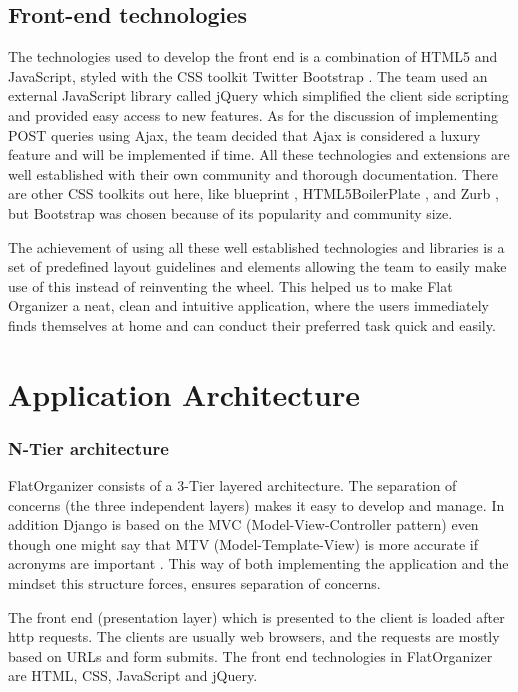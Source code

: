 \documentclass{sig-alt-release2}
\begin{document}
\subsection{Front-end technologies}

The technologies used to develop the front end is a combination of HTML5 and JavaScript, styled with the CSS toolkit Twitter Bootstrap \cite{x14}. The team used an external JavaScript library called jQuery \cite{x15} which simplified the client side scripting and provided easy access to new features. As for the discussion of implementing POST queries using Ajax, the team decided that Ajax is considered a luxury feature and will be implemented if time. All these technologies and extensions are well established with their own community and thorough documentation. There are other CSS toolkits out here, like blueprint \cite{x16}, HTML5BoilerPlate \cite{x17}, and Zurb \cite{x18}, but Bootstrap was chosen because of its popularity and community size. 

The achievement of using all these well established technologies and libraries is a set of predefined layout guidelines and elements allowing the team to easily make use of this instead of reinventing the wheel. This helped us to make Flat Organizer a neat, clean and intuitive application, where the users immediately finds themselves at home and can conduct their preferred task quick and easily.

\section{Application Architecture}

\subsubsection{N-Tier architecture}
FlatOrganizer consists of a 3-Tier layered architecture. The separation of concerns (the three independent layers) makes it easy to develop and manage. In addition Django is based on the MVC (Model-View-Controller pattern) even though one might say that MTV (Model-Template-View) is more accurate if acronyms are important \cite{django1}. This way of both implementing the application and the mindset this structure forces, ensures separation of concerns.

The front end (presentation layer) which is presented to the client is loaded after http requests. The clients are usually web browsers, and the requests are mostly based on URLs and form submits. The front end technologies in FlatOrganizer are HTML, CSS, JavaScript and jQuery.
\end{document}
